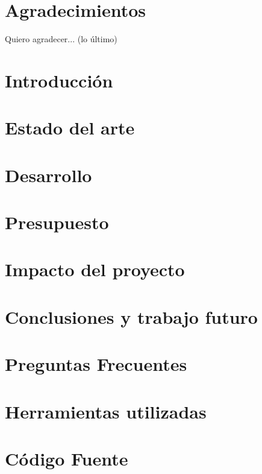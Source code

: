 \documentclass[12pt,a4paper]{report}
\begin{document}
\chapter*{Agradecimientos}
Quiero agradecer... (lo último)

\listoffigures



\hypersetup{pageanchor=false}
\hypersetup{linkcolor=black}
\tableofcontents

\chapter{Introducción}
\label{sec:cap1}

\chapter{Estado del arte}
\label{sec:cap2}

\chapter{Desarrollo}
\label{sec:cap3}

% 
\chapter{Presupuesto}
\label{sec:cap5}

\chapter{Impacto del proyecto}
\label{sec:cap6}

\chapter{Conclusiones y trabajo futuro}
\label{sec:cap7}


\nocite{librodeldragon}
\nocite{ide}
\nocite{intro}
\nocite{primerproyectojavacc}
\nocite{robertfisher}
\nocite{xquery}
\nocite{oracle}
\nocite{netbeans}
\printbibliography

\appendix
\label{sec:apendice}
\chapter{Preguntas Frecuentes}

\chapter{Herramientas utilizadas}

\chapter{Código Fuente}
\label{sec:codigofuente}

\end{document}
